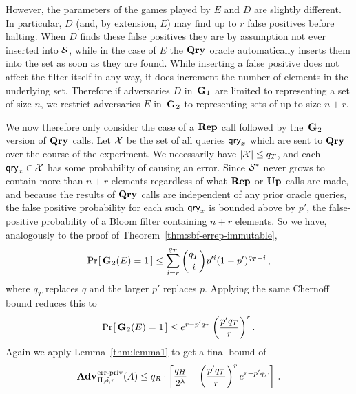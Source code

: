 However, the parameters of the games played by $E$ and $D$ are slightly
different. In particular, $D$ (and, by extension, $E$) may find up to $r$
false positives before halting. When $D$ finds these false positives they
are by assumption not ever inserted into $\mathcal{S}$, while in the case of $E$ the
$\textup{\textbf{Qry}}\hspace{0.5pt}$ oracle automatically inserts them into the set as soon as they are
found. While inserting a false positive does not affect the filter itself in any
way, it does increment the number of elements in the underlying set. Therefore
if adversaries $D$ in~$\textup{\textbf{G}}\hspace{0.5pt}_1$ are limited to representing a set of size
$n$, we restrict adversaries $E$ in~$\textup{\textbf{G}}\hspace{0.5pt}_2$ to representing sets of up to size
$n+r$.


We now therefore only consider the case of a $\textup{\textbf{Rep}}\hspace{0.5pt}$ call followed by
the~$\textup{\textbf{G}}\hspace{0.5pt}_2$ version of $\textup{\textbf{Qry}}\hspace{0.5pt}$ calls. Let $\mathcal{X}$ be the set of all queries
$\mathsf{qry}_x$ which are sent to $\textup{\textbf{Qry}}\hspace{0.5pt}$ over the course of the experiment. We
necessarily have $|\mathcal{X}| \le q_T$, and each $\mathsf{qry}_x \in \mathcal{X}$ has some
probability of causing an error. Since $\mathcal{S}^*$ never grows to contain more than
$n+r$ elements regardless of what $\textup{\textbf{Rep}}\hspace{0.5pt}$ or $\textup{\textbf{Up}}\hspace{0.5pt}$ calls are made, and because
the results of $\textup{\textbf{Qry}}\hspace{0.5pt}$ calls are independent of any prior oracle queries, the
false positive probability for each such $\mathsf{qry}_x$ is bounded
above by $p'$, the false-positive probability of a Bloom filter containing $n+r$
elements. So we have, analogously to the proof of
Theorem~\ref{thm:sbf-errep-immutable},
\begin{equation}
   \Pr\hspace{-1pt}\left[\,\textup{\textbf{G}}\hspace{0.5pt}_2(E)=1\,\right] \le
     \sum_{i=r}^{q_T} \binom{q_T}{i}p'^i(1-p')^{q_T-i} \,,
\end{equation}
where $q_T$ replaces $q$ and the larger $p'$ replaces $p$. Applying the same Chernoff bound reduces this to
\begin{equation}
   \Pr\hspace{-1pt}\left[\,\textup{\textbf{G}}\hspace{0.5pt}_2(E)=1\,\right] \le
     e^{r-p'q_T}\left(\frac{p'q_T}{r}\right)^r.
\end{equation}
%
Again we apply Lemma~\ref{thm:lemma1} to get a final bound of
\begin{equation}
  \Adv{\erreps}_{\Pi,\delta,r}(\advA) \leq
    q_R \cdot \left[
      \frac{q_H}{2^\lambda} +
      \left(\frac{p'q_T}{r}\right)^re^{r-p'q_T}
    \right] \,.
\end{equation}
